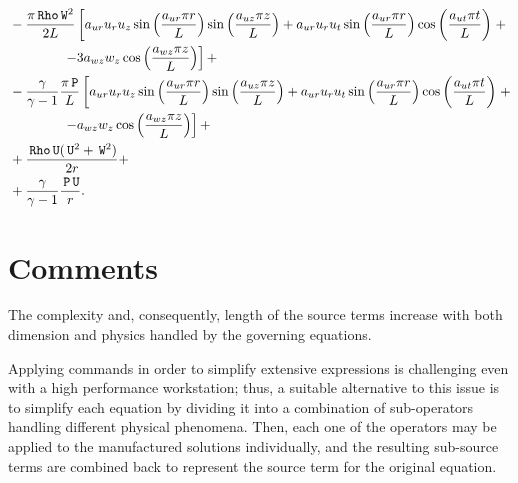 \documentclass[10pt]{article}
\newcommand{\Rho}{\,\mathtt{Rho}}
\newcommand{\PP}{\,\mathtt{P}}
\newcommand{\U}{\,\mathtt{U}}
\newcommand{\W}{\,\mathtt{W}}
\begin{document}
\begin{equation}
 \begin{split}
 \displaystyle
&-\dfrac{\pi \Rho \W^2}{2L} \left[ a_{ur} u_r u_z \sin\left(\dfrac{a_{ur} \pi r}{L}\right) \sin\left(\dfrac{a_{uz} \pi z}{L}\right)+a_{ur} u_r u_t \sin\left(\dfrac{a_{ur} \pi r}{L}\right) \cos\left(\dfrac{a_{ut} \pi t}{L}\right)\right.+\\
    &\qquad\qquad\left.-3 a_{wz} w_z \cos\left(\dfrac{a_{wz} \pi z}{L}\right)\right]+ \\
&- \dfrac{\gamma}{\gamma-1}\dfrac{\pi \PP}{L}\left[ a_{ur} u_r u_z \sin\left(\dfrac{a_{ur} \pi r}{L}\right) \sin\left(\dfrac{a_{uz} \pi z}{L}\right)+a_{ur} u_r u_t \sin\left(\dfrac{a_{ur} \pi r}{L}\right) \cos\left(\dfrac{a_{ut} \pi t}{L}\right)\right.+\\
    &\qquad\qquad\left.-a_{wz} w_z \cos\left(\dfrac{a_{wz} \pi z}{L}\right)\right] +\\
&+ \dfrac{ \Rho \U(\U^2+\W^2)}{2r}+\\
&+\dfrac{\gamma}{\gamma-1} \dfrac{\PP \U }{r}.
\end{split}
\end{equation}



\section{Comments}


The complexity and, consequently, length of the source terms increase with both dimension and physics handled by the governing equations.



Applying commands in order to simplify extensive expressions is challenging even with a high performance workstation; thus, a suitable alternative to this issue is to simplify each equation by dividing it into a combination of sub-operators handling different physical phenomena. Then, each one of the operators may be applied to the manufactured solutions individually, and the resulting sub-source terms are combined back to represent the source term for the original equation.
\end{document}
